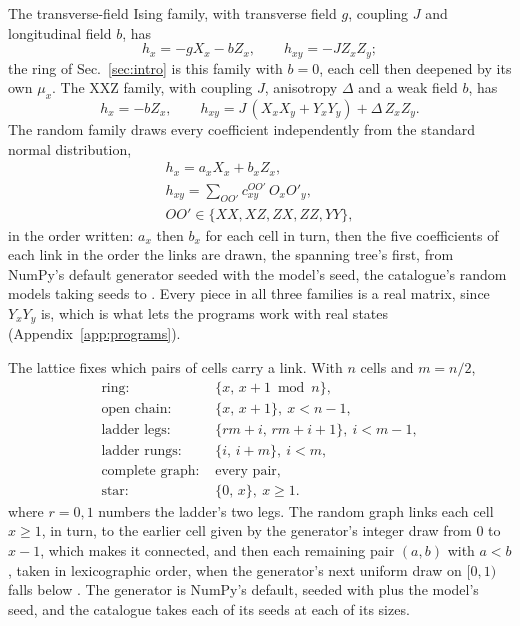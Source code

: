 \documentclass[aps,prd,reprint,superscriptaddress]{revtex4-2}
\begin{document}
The transverse-field Ising family, with transverse field $g$, coupling $J$ and longitudinal field $b$, has
\begin{equation}
  h_x = -g X_x - b Z_x, \qquad h_{xy} = -J Z_x Z_y ;
  \label{eq:ising}
\end{equation}
the ring of Sec.~\ref{sec:intro} is this family with $b = 0$, each cell then deepened by its own $\mu_x$. The XXZ family, with coupling $J$, anisotropy $\Delta$ and a weak field $b$, has
\begin{equation}
  h_x = -b Z_x, \qquad h_{xy} = J\,(X_x X_y + Y_x Y_y) + \Delta\, Z_x Z_y .
  \label{eq:xxz}
\end{equation}
The random family draws every coefficient independently from the standard normal distribution,
\begin{equation}
\begin{gathered}
  h_x = a_x X_x + b_x Z_x, \\
  h_{xy} = \sum_{OO'} c^{OO'}_{xy}\, O_x O'_y, \\
  OO' \in \{XX, XZ, ZX, ZZ, YY\},
\end{gathered}
  \label{eq:random}
\end{equation}
in the order written: $a_x$ then $b_x$ for each cell in turn, then the five coefficients of each link in the order the links are drawn, the spanning tree's first, from NumPy's default generator seeded with the model's seed, the catalogue's random models taking seeds  to . Every piece in all three families is a real matrix, since $Y_x Y_y$ is, which is what lets the programs work with real states (Appendix~\ref{app:programs}).

The lattice fixes which pairs of cells carry a link. With $n$ cells and $m = n/2$,
\begin{equation}
\begin{aligned}
  \text{ring: } & \{x,\, x{+}1 \bmod n\}, \\
  \text{open chain: } & \{x,\, x{+}1\},\ x < n - 1, \\
  \text{ladder legs: } & \{rm + i,\, rm + i + 1\},\ i < m - 1, \\
  \text{ladder rungs: } & \{i,\, i + m\},\ i < m, \\
  \text{complete graph: } & \text{every pair}, \\
  \text{star: } & \{0,\, x\},\ x \ge 1 .
\end{aligned}
\label{eq:lattices}
\end{equation}
where $r = 0, 1$ numbers the ladder's two legs. The random graph links each cell $x \ge 1$, in turn, to the earlier cell given by the generator's integer draw from $0$ to $x - 1$, which makes it connected, and then each remaining pair $(a, b)$ with $a < b$, taken in lexicographic order, when the generator's next uniform draw on $[0, 1)$ falls below . The generator is NumPy's default, seeded with  plus the model's seed, and the catalogue takes each of its seeds at each of its sizes.
\end{document}
